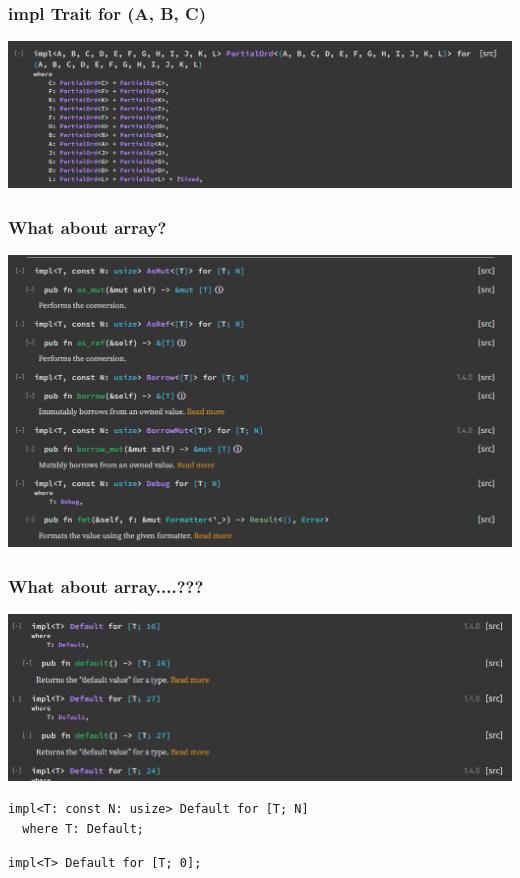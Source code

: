 \documentclass[UTF-8]{ctexbeamer}
\begin{document}
\begin{frame}
  \frametitle{impl Trait for (A, B, C)}

  \includegraphics[width=\textwidth]{assets/tuple.png}
\end{frame}

\begin{frame}
  \frametitle{What about array?}

  \includegraphics[width=\textwidth]{assets/array-good.png}
\end{frame}

\begin{frame}[fragile]
  \frametitle{What about array....???}

  \includegraphics[width=\textwidth]{assets/array-bad.png}

  \pause
  \vspace{1em}

  \begin{verbatim}
impl<T: const N: usize> Default for [T; N]
  where T: Default;
  \end{verbatim}

  \pause

  \begin{verbatim}
impl<T> Default for [T; 0];
  \end{verbatim}
\end{frame}
\end{document}
